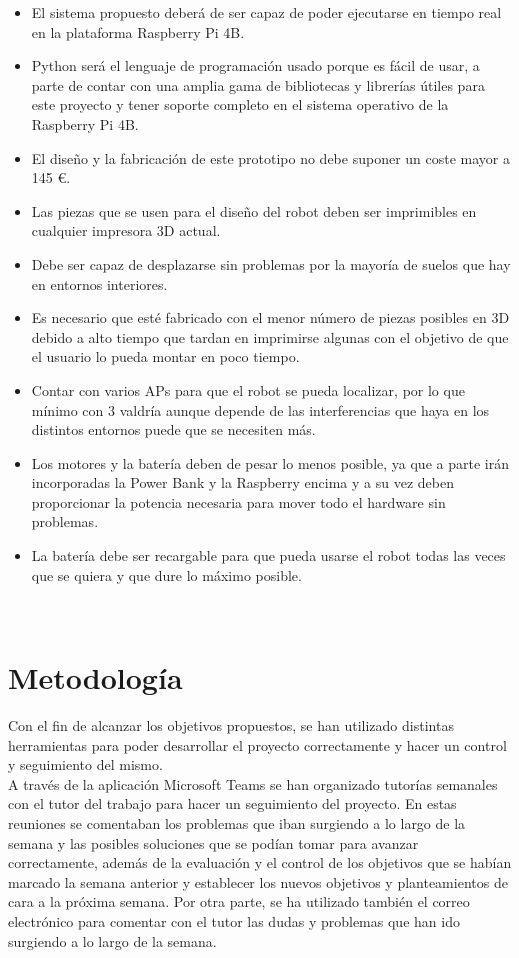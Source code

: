 \begin{itemize}
 \item \textit{} El sistema propuesto deberá de ser capaz de poder ejecutarse en tiempo real en la plataforma Raspberry Pi 4B.
 \item \textit{} Python será el lenguaje de programación usado porque es fácil de usar, a parte de contar con una amplia gama de bibliotecas 
 y librerías útiles para este proyecto y tener soporte completo en el sistema operativo de la Raspberry Pi 4B.
 \item \textit{} El diseño y la fabricación de este prototipo no debe suponer un coste mayor a 145 \euro.
 \item \textit{} Las piezas que se usen para el diseño del robot deben ser imprimibles en cualquier impresora 3D actual.
 \item \textit{} Debe ser capaz de desplazarse sin problemas por la mayoría de suelos que hay en entornos interiores.
 \item \textit{} Es necesario que esté fabricado con el menor número de piezas posibles en 3D debido a alto tiempo que tardan en imprimirse algunas
 con el objetivo de que el usuario lo pueda montar en poco tiempo.
 \item \textit{} Contar con varios APs para que el robot se pueda localizar, por lo que mínimo con 3 valdría aunque depende de las interferencias que haya en los distintos entornos puede que se necesiten más.
 \item \textit{} Los motores y la batería deben de pesar lo menos posible, ya que a parte irán incorporadas la Power Bank y la Raspberry encima y a su vez deben proporcionar la potencia necesaria para mover todo el hardware sin problemas.
 \item \textit{} La batería debe ser recargable para que pueda usarse el robot todas las veces que se quiera y que dure lo máximo posible.
 
\end{itemize}\

 
\section{Metodología}
\label{sec:metodologia}

Con el fin de alcanzar los objetivos propuestos, se han utilizado distintas herramientas para poder desarrollar el proyecto correctamente y
hacer un control y seguimiento del mismo.\\

A través de la aplicación Microsoft Teams se han organizado tutorías semanales con el tutor del trabajo para hacer un seguimiento del proyecto. En estas reuniones se comentaban los problemas que iban surgiendo a lo largo de la semana y las posibles soluciones que se podían tomar para avanzar correctamente, además de la evaluación y el control de los objetivos que se habían marcado la semana anterior y establecer los nuevos objetivos y planteamientos de cara a la próxima semana. Por otra parte, se ha utilizado también el correo electrónico para comentar con el tutor las dudas y problemas que han ido surgiendo a lo largo de la semana.\\ 


